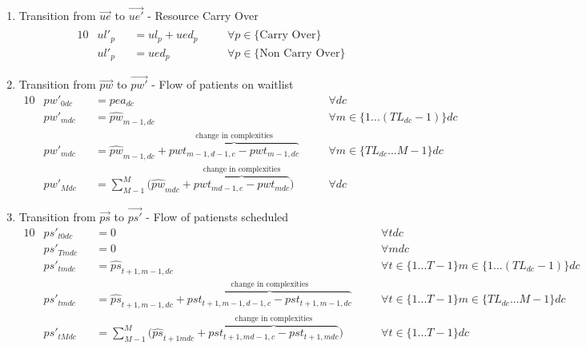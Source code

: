 \documentclass{article}
\begin{document}
\begin{enumerate}
	\item Transition from $\vec{ue}$ to $\vec{ue'}$ - Resource Carry Over
	\begin{alignat}{10}
		& ul'_{p} 
			&& = \hat{ul}_{p} + ued_{p} \quad 
			&& \forall p \in \{ \text{Carry Over}\} \\
		& ul'_{p} 
			&& = ued_{p} \quad 
			&& \forall p \in \{ \text{Non Carry Over}\} 
	\end{alignat} 

	
	\item Transition from $\vec{pw}$ to $\vec{pw'}$ - Flow of patients on waitlist
		\begin{alignat}{10}
			& pw'_{0dc} 
				&& = pea_{dc} \quad
				&& \forall dc \\  
			& pw'_{mdc} 
				&& = \hat{pw}_{m-1,dc}
				&& \forall m \in \{ 1...(TL_{dc}-1) \} dc \\  
			& pw'_{mdc} 
				&& = \hat{pw}_{m-1,dc} + 
				\overbrace{pwt_{m-1,d-1,c} - pwt_{m-1,dc}}^\text{
					change in complexities} \quad
				&& \forall m \in \{ TL_{dc}...M-1 \} dc \\  
			& pw'_{Mdc} 
				&& = \sum_{M-1}^{M} \big( 
					\hat{pw}_{mdc} + 
					\overbrace{pwt_{md-1,c} - pwt_{mdc}}^\text{
						change in complexities} \big) \quad
				&& \forall dc
		\end{alignat}


	\item Transition from $\vec{ps}$ to $\vec{ps'}$ - Flow of patiensts scheduled
		\begin{alignat}{10}
			& ps'_{t0dc} 
				&& = 0 \quad
				&& \forall tdc \\  
			& ps'_{Tmdc} 
				&& = 0 \quad
				&& \forall mdc \\  
			& ps'_{tmdc} 
				&& = \hat{ps}_{t+1,m-1,dc} \quad 
				&& \forall t \in \{1...T-1\} m \in \{ 1... (TL_{dc}-1) \} dc \\ 
			& ps'_{tmdc} 
				&& = \hat{ps}_{t+1,m-1,dc} + 
				\overbrace{pst_{t+1,m-1,d-1,c} - pst_{t+1,m-1,dc}}^\text{
					change in complexities} \quad
				&& \forall t \in \{1...T-1\} m \in \{ TL_{dc}...M-1 \} dc \\  
			& ps'_{tMdc} 
				&& = \sum_{M-1}^{M} \big( 
				\hat{ps}_{t+1mdc} + 
				\overbrace{pst_{t+1,md-1,c} - pst_{t+1,mdc}}^\text{
					change in complexities} \big) \quad
				&& \forall t \in \{1...T-1\} dc
		\end{alignat}
\end{enumerate}
    
\end{document}
